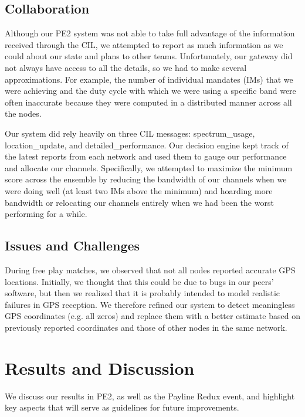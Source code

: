 \documentclass[11pt]{article}
\begin{document}
\subsection{Collaboration}

Although our PE2 system was not able to take full advantage of the information received through the CIL, we attempted to report as much information as we could about our state and plans to other teams. Unfortunately, our gateway did not always have access to all the details, so we had to make several approximations. For example, the number of individual mandates (IMs) that we were achieving and the duty cycle with which we were using a specific band were often inaccurate because they were computed in a distributed manner across all the nodes.

Our system did rely heavily on three CIL messages: spectrum\_usage, location\_update, and detailed\_performance. Our decision engine kept track of the latest reports from each network and used them to gauge our performance and allocate our channels. Specifically, we attempted to maximize the minimum score across the ensemble by reducing the bandwidth of our channels when we were doing well (at least two IMs above the minimum) and hoarding more bandwidth or relocating our channels entirely when we had been the worst performing for a while.

\subsection{Issues and Challenges}

During free play matches, we observed that not all nodes reported accurate GPS locations. Initially, we thought that this could be due to bugs in our peers' software, but then we realized that it is probably intended to model realistic failures in GPS reception. We therefore refined our system to detect meaningless GPS coordinates (e.g. all zeros) and replace them with a better estimate based on previously reported coordinates and those of other nodes in the same network.

\section{Results and Discussion}
We discuss our results in PE2, as well as the Payline Redux event, and highlight key aspects that will serve as guidelines for future improvements.
\end{document}
